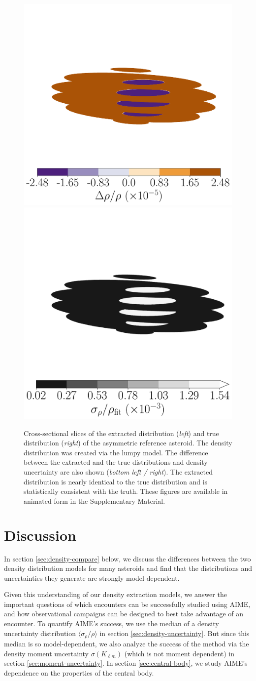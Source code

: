 \documentclass[fleqn,usenatbib]{mnras}
\begin{document}
\begin{figure}
  \includegraphics[width=0.49\linewidth]{figs/side-by-side-s} \hfill
  \includegraphics[width=0.49\linewidth]{figs/side-by-side-u}
  \caption{Cross-sectional slices of the extracted distribution (\textit{left}) and true distribution (\textit{right}) of the asymmetric reference asteroid. The density distribution was created via the lumpy model. The difference between the extracted and the true distributions and density uncertainty are also shown (\textit{bottom left / right}). The extracted distribution is nearly identical to the true distribution and is statistically consistent with the truth. These figures are available in animated form in the Supplementary Material.}
  \label{fig:den-side-by-side}
\end{figure}



\section{Discussion}
\label{sec:discussion}
In section \ref{sec:density-compare} below, we discuss the differences between the two density distribution models for many asteroids and find that the distributions and uncertainties they generate are strongly model-dependent.

Given this understanding of our density extraction models, we answer the important questions of which encounters can be successfully studied using AIME, and how observational campaigns can be designed to best take advantage of an encounter. To quantify AIME's success, we use the median of a density uncertainty distribution $\langle \sigma_\rho / \rho \rangle$ in section \ref{sec:density-uncertainty}. But since this median is so model-dependent, we also analyze the success of the method via the density moment uncertainty $\sigma (K_{\ell m})$ (which is not moment dependent) in section \ref{sec:moment-uncertainty}. In section \ref{sec:central-body}, we study AIME's dependence on the properties of the central body.
\end{document}
